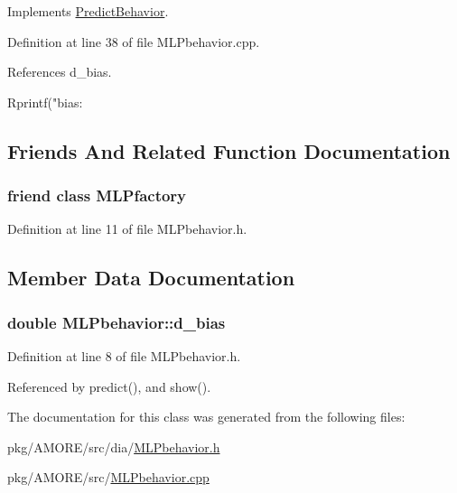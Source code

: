 Implements \hyperlink{class_predict_behavior_a9ef84360f73784248d994fa4707c1dde}{PredictBehavior}.



Definition at line 38 of file MLPbehavior.cpp.



References d\_\-bias.


\begin{DoxyCode}
{
  Rprintf("\n bias: %
}
\end{DoxyCode}


\subsection{Friends And Related Function Documentation}
\hypertarget{class_m_l_pbehavior_a1aa48940238b9487734e590ffab33a1b}{
\subsubsection[{MLPfactory}]{\setlength{\rightskip}{0pt plus 5cm}friend class {\bf MLPfactory}}}
\label{class_m_l_pbehavior_a1aa48940238b9487734e590ffab33a1b}


Definition at line 11 of file MLPbehavior.h.



\subsection{Member Data Documentation}
\hypertarget{class_m_l_pbehavior_a6206785c5c3f838a0538f9f77fa7a25a}{
\subsubsection[{d\_\-bias}]{\setlength{\rightskip}{0pt plus 5cm}double {\bf MLPbehavior::d\_\-bias}}}
\label{class_m_l_pbehavior_a6206785c5c3f838a0538f9f77fa7a25a}


Definition at line 8 of file MLPbehavior.h.



Referenced by predict(), and show().



The documentation for this class was generated from the following files:\begin{DoxyCompactItemize}
\item 
pkg/AMORE/src/dia/\hyperlink{_m_l_pbehavior_8h}{MLPbehavior.h}\item 
pkg/AMORE/src/\hyperlink{_m_l_pbehavior_8cpp}{MLPbehavior.cpp}\end{DoxyCompactItemize}
